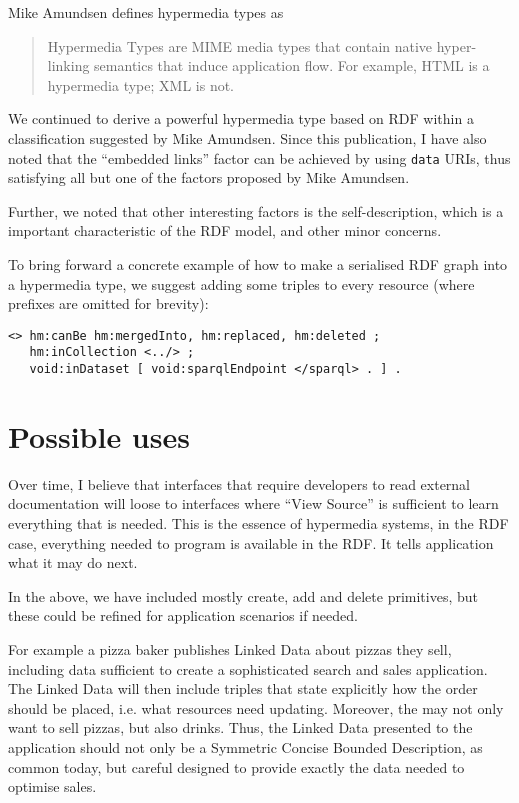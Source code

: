 \documentclass{article}
\begin{document}
Mike Amundsen defines hypermedia types\cite{hypermediatypes} as 
\begin{quote}
Hypermedia Types are MIME media types that contain native
hyper-linking semantics that induce application flow. For example,
HTML is a hypermedia type; XML is not.
\end{quote}

We continued to derive a powerful hypermedia type based on RDF within
a classification suggested by Mike Amundsen. Since this publication, I
have also noted that the ``embedded links'' factor can be achieved by
using \texttt{data} URIs, thus satisfying all but one of the factors
proposed by Mike Amundsen.

Further, we noted that other interesting factors is the
self-description, which is a important characteristic of the RDF
model, and other minor concerns.

To bring forward a concrete example of how to make a serialised RDF
graph into a hypermedia type, we suggest adding some triples to every
resource (where prefixes are omitted for brevity):

\begin{verbatim}
<> hm:canBe hm:mergedInto, hm:replaced, hm:deleted ;
   hm:inCollection <../> ;
   void:inDataset [ void:sparqlEndpoint </sparql> . ] .
\end{verbatim}

\section{Possible uses}

Over time, I believe that interfaces that require developers to read
external documentation will loose to interfaces where ``View Source''
is sufficient to learn everything that is needed. This is the essence
of hypermedia systems, in the RDF case, everything needed to program
is available in the RDF. It tells application what it may do next.

In the above, we have included mostly create, add and delete
primitives, but these could be refined for application scenarios if
needed.

For example a pizza baker publishes Linked Data about pizzas they
sell, including data sufficient to create a sophisticated search and
sales application. The Linked Data will then include triples that
state explicitly how the order should be placed, i.e. what resources
need updating. Moreover, the may not only want to sell pizzas, but
also drinks. Thus, the Linked Data presented to the application should
not only be a Symmetric Concise Bounded Description, as common today,
but careful designed to provide exactly the data needed to optimise
sales.


%
%

\end{document}
